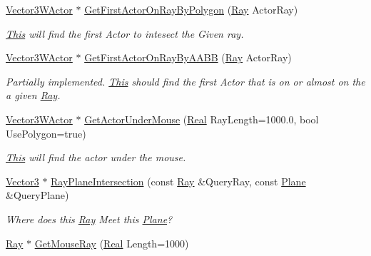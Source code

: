 \begin{DoxyCompactItemize}
\hyperlink{classphys_1_1Vector3WActor}{Vector3WActor} $\ast$ \hyperlink{classphys_1_1WorldQueryTool_a256022003d64756b0b5c5706aefd5139}{GetFirstActorOnRayByPolygon} (\hyperlink{classphys_1_1Ray}{Ray} ActorRay)
\begin{DoxyCompactList}\small\item\em \hyperlink{structThis}{This} will find the first Actor to intesect the Given ray. \item\end{DoxyCompactList}\item 
\hyperlink{classphys_1_1Vector3WActor}{Vector3WActor} $\ast$ \hyperlink{classphys_1_1WorldQueryTool_a67575416c2e9c652bbd873649ee38baf}{GetFirstActorOnRayByAABB} (\hyperlink{classphys_1_1Ray}{Ray} ActorRay)
\begin{DoxyCompactList}\small\item\em Partially implemented. \hyperlink{structThis}{This} should find the first Actor that is on or almost on the a given \hyperlink{classphys_1_1Ray}{Ray}. \item\end{DoxyCompactList}\item 
\hyperlink{classphys_1_1Vector3WActor}{Vector3WActor} $\ast$ \hyperlink{classphys_1_1WorldQueryTool_a8efba55076bad228d7cda0b82895f32a}{GetActorUnderMouse} (\hyperlink{namespacephys_af7eb897198d265b8e868f45240230d5f}{Real} RayLength=1000.0, bool UsePolygon=true)
\begin{DoxyCompactList}\small\item\em \hyperlink{structThis}{This} will find the actor under the mouse. \item\end{DoxyCompactList}\item 
\hyperlink{classphys_1_1Vector3}{Vector3} $\ast$ \hyperlink{classphys_1_1WorldQueryTool_adfc5ea4a115ad8bb716dea87d8419e6f}{RayPlaneIntersection} (const \hyperlink{classphys_1_1Ray}{Ray} \&QueryRay, const \hyperlink{classphys_1_1Plane}{Plane} \&QueryPlane)
\begin{DoxyCompactList}\small\item\em Where does this \hyperlink{classphys_1_1Ray}{Ray} Meet this \hyperlink{classphys_1_1Plane}{Plane}? \item\end{DoxyCompactList}\item 
\hyperlink{classphys_1_1Ray}{Ray} $\ast$ \hyperlink{classphys_1_1WorldQueryTool_a567b20eb6ba6f17961f5cd892bd5a0ed}{GetMouseRay} (\hyperlink{namespacephys_af7eb897198d265b8e868f45240230d5f}{Real} Length=1000)

\end{DoxyCompactItemize}
